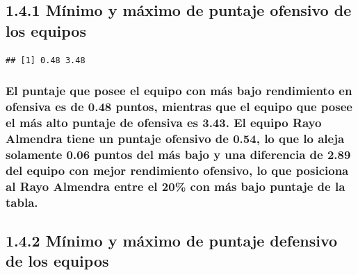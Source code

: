 \documentclass[]{article}
\newenvironment{Shaded}{\begin{snugshade}}{\end{snugshade}}
\newcommand{\CommentTok}[1]{\textcolor[rgb]{0.56,0.35,0.01}{\textit{#1}}}
\newcommand{\KeywordTok}[1]{\textcolor[rgb]{0.13,0.29,0.53}{\textbf{#1}}}
\newcommand{\NormalTok}[1]{#1}
\newcommand{\OperatorTok}[1]{\textcolor[rgb]{0.81,0.36,0.00}{\textbf{#1}}}
\begin{document}
\hypertarget{minimo-y-maximo-de-puntaje-ofensivo-de-los-equipos}{%
\subsection{1.4.1 Mínimo y máximo de puntaje ofensivo de los
equipos}\label{minimo-y-maximo-de-puntaje-ofensivo-de-los-equipos}}

\begin{Shaded}
\end{Shaded}

\begin{verbatim}
## [1] 0.48 3.48
\end{verbatim}

\hypertarget{el-puntaje-que-posee-el-equipo-con-mas-bajo-rendimiento-en-ofensiva-es-de-0.48-puntos-mientras-que-el-equipo-que-posee-el-mas-alto-puntaje-de-ofensiva-es-3.43.-el-equipo-rayo-almendra-tiene-un-puntaje-ofensivo-de-0.54-lo-que-lo-aleja-solamente-0.06-puntos-del-mas-bajo-y-una-diferencia-de-2.89-del-equipo-con-mejor-rendimiento-ofensivo-lo-que-posiciona-al-rayo-almendra-entre-el-20-con-mas-bajo-puntaje-de-la-tabla.}{%
\subsubsection{El puntaje que posee el equipo con más bajo rendimiento
en ofensiva es de 0.48 puntos, mientras que el equipo que posee el más
alto puntaje de ofensiva es 3.43. El equipo Rayo Almendra tiene un
puntaje ofensivo de 0.54, lo que lo aleja solamente 0.06 puntos del más
bajo y una diferencia de 2.89 del equipo con mejor rendimiento ofensivo,
lo que posiciona al Rayo Almendra entre el 20\% con más bajo puntaje de
la
tabla.}\label{el-puntaje-que-posee-el-equipo-con-mas-bajo-rendimiento-en-ofensiva-es-de-0.48-puntos-mientras-que-el-equipo-que-posee-el-mas-alto-puntaje-de-ofensiva-es-3.43.-el-equipo-rayo-almendra-tiene-un-puntaje-ofensivo-de-0.54-lo-que-lo-aleja-solamente-0.06-puntos-del-mas-bajo-y-una-diferencia-de-2.89-del-equipo-con-mejor-rendimiento-ofensivo-lo-que-posiciona-al-rayo-almendra-entre-el-20-con-mas-bajo-puntaje-de-la-tabla.}}

\hypertarget{minimo-y-maximo-de-puntaje-defensivo-de-los-equipos}{%
\subsection{1.4.2 Mínimo y máximo de puntaje defensivo de los
equipos}\label{minimo-y-maximo-de-puntaje-defensivo-de-los-equipos}}
\end{document}

